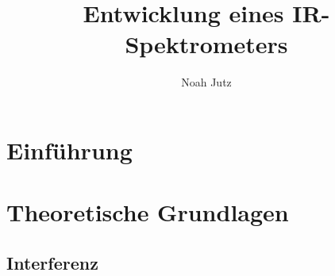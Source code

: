 \documentclass{article}
\title{Entwicklung eines IR-Spektrometers}
\author{Noah Jutz}
\date{}
\begin{document}
\maketitle
\tableofcontents


\section{Einführung}












\section{Theoretische Grundlagen}


\subsection{Interferenz}

\end{document}
